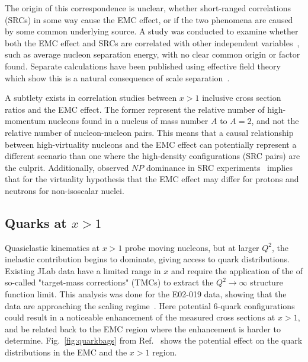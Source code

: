 The origin of this correspondence is unclear, whether short-ranged correlations (SRCs) in some way cause the EMC effect, or if the two
phenomena are caused by some common underlying source.  A study was conducted to examine whether
both the EMC effect and SRCs are correlated with other independent variables~\cite{Arrington:2012ax}, such
as average nucleon separation energy, with no clear common origin or factor found.  Separate calculations have been 
published using effective field theory which show this is a natural consequence of scale separation~\cite{PhysRevLett.119.262502}.

A subtlety exists in correlation studies between $x>1$ inclusive cross section ratios and the EMC effect. The former represent the relative number of high-momentum nucleons found in a nucleus of mass number $A$ to $A=2$, and not the relative number of nucleon-nucleon pairs.  This means that a causal relationship between high-virtuality nucleons and the EMC effect can potentially represent a different scenario than one where the high-density configurations (SRC pairs) are the culprit.  Additionally, observed $NP$ dominance in SRC experiments~\cite{Subedi:2008zz} implies that for the virtuality hypothesis that the EMC effect may differ for protons and neutrons for non-isoscalar nuclei.

\subsection{Quarks at $x>1$}
Quasielastic kinematics at $x>1$ probe moving nucleons, but at larger $Q^2$, the inelastic contribution begins to dominate, giving access to quark distributions. Existing JLab data have a limited range in $x$ and require the application of the of so-called "target-mass corrections" (TMCs) to extract the $Q^2 \to \infty$ structure function limit.  This analysis was done for the E02-019 data, showing that the data are approaching the scaling regime~\cite{Fomin:2010ei}.  Here potential 6-quark configurations could result in a noticeable enhancement of the measured cross sections at $x>1$, and be related back to the EMC region where the enhancement is harder to determine.  Fig.~\ref{fig:quarkbags} from Ref.~\cite{Arrington:2003qt} shows the potential effect on the quark distributions in the EMC and the $x>1$ region.


